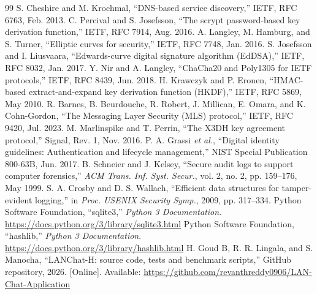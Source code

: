 \documentclass[conference]{IEEEtran}
\begin{document}
\begin{thebibliography}{99}
 S. Cheshire and M. Krochmal, ``DNS-based service discovery,'' IETF, RFC 6763, Feb. 2013.
 C. Percival and S. Josefsson, ``The scrypt password-based key derivation function,'' IETF, RFC 7914, Aug. 2016.
 A. Langley, M. Hamburg, and S. Turner, ``Elliptic curves for security,'' IETF, RFC 7748, Jan. 2016.
 S. Josefsson and I. Liusvaara, ``Edwards-curve digital signature algorithm (EdDSA),'' IETF, RFC 8032, Jan. 2017.
 Y. Nir and A. Langley, ``ChaCha20 and Poly1305 for IETF protocols,'' IETF, RFC 8439, Jun. 2018.
 H. Krawczyk and P. Eronen, ``HMAC-based extract-and-expand key derivation function (HKDF),'' IETF, RFC 5869, May 2010.
 R. Barnes, B. Beurdouche, R. Robert, J. Millican, E. Omara, and K. Cohn-Gordon, ``The Messaging Layer Security (MLS) protocol,'' IETF, RFC 9420, Jul. 2023.
 M. Marlinspike and T. Perrin, ``The X3DH key agreement protocol,'' Signal, Rev. 1, Nov. 2016.
 P. A. Grassi \emph{et al.}, ``Digital identity guidelines: Authentication and lifecycle management,'' NIST Special Publication 800-63B, Jun. 2017.
 B. Schneier and J. Kelsey, ``Secure audit logs to support computer forensics,'' \emph{ACM Trans. Inf. Syst. Secur.}, vol. 2, no. 2, pp. 159--176, May 1999.
 S. A. Crosby and D. S. Wallach, ``Efficient data structures for tamper-evident logging,'' in \emph{Proc. USENIX Security Symp.}, 2009, pp. 317--334.
 Python Software Foundation, ``sqlite3,'' \emph{Python 3 Documentation}. \url{https://docs.python.org/3/library/sqlite3.html}
 Python Software Foundation, ``hashlib,'' \emph{Python 3 Documentation}. \url{https://docs.python.org/3/library/hashlib.html}
 H. Goud B, R. R. Lingala, and S. Manocha, ``LANChat-H: source code, tests and benchmark scripts,'' GitHub repository, 2026. [Online]. Available: \url{https://github.com/revanthreddy0906/LAN-Chat-Application}

\end{thebibliography}
\end{document}
